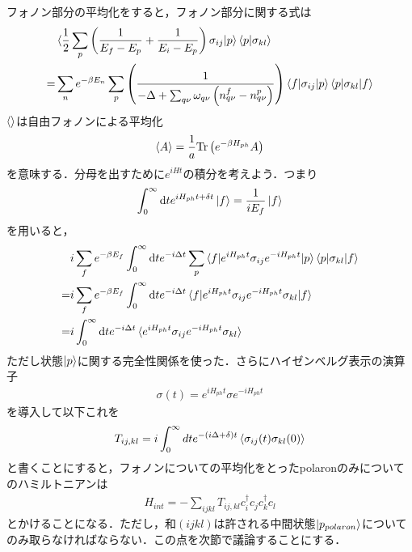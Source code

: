 \documentclass[a4j]{jarticle}
\begin{document}
フォノン部分の平均化をすると，フォノン部分に関する式は
\begin{align*}
 &\braket{\frac{1}{2}\sum_{p}\left(\frac{1}{E_f-E_p}+\frac{1}{E_i-E_p}\right)\sigma_{ij} |p}\braket{p |\sigma_{kl}} \\
=&\sum_{n}e^{-\beta E_n}\sum_{p}\left(\frac{1}{-\Delta +\sum_{q\nu}\omega_{q\nu}\left(n^f_{q\nu}-n^p_{q\nu}\right)}\right)\braket{f|\sigma_{ij}|p}\braket{p|\sigma_{kl}|f}
\end{align*}
$\braket{}$は自由フォノンによる平均化
\begin{align}
 \braket{A}=\frac{1}{a}\mathrm{Tr}\left(e^{-\beta H_{ph}}A\right)
\end{align}
を意味する．分母を出すために$e^{iHt}$の積分を考えよう．つまり
\begin{align*}
 \int_{0}^{\infty}\mathrm{d}te^{iH_{ph}t+\delta t}\ket{f}=\frac{1}{iE_f}\ket{f}
\end{align*}
を用いると，
\begin{align*}
 &i\sum_{f}e^{-\beta E_f}\int_{0}^{\infty}\mathrm{d}te^{-i\Delta t}\sum_{p}\braket{f|e^{iH_{ph}t}\sigma_{ij}e^{-iH_{ph}t}|p}\braket{p|\sigma_{kl}|f} \\
=&i\sum_{f}e^{-\beta E_f}\int_{0}^{\infty}\mathrm{d}te^{-i\Delta t}\braket{f|e^{iH_{ph}t}\sigma_{ij}e^{-iH_{ph}t}\sigma_{kl}|f} \\ 
=&i\int_{0}^{\infty}\mathrm{d}te^{-i\Delta t}\braket{e^{iH_{ph}t}\sigma_{ij}e^{-iH_{ph}t}\sigma_{kl}} 
\end{align*}
ただし状態$\ket{p}$に関する完全性関係を使った．さらにハイゼンベルグ表示の演算子
\begin{align}
 \sigma(t)=e^{iH_{ph}t}\sigma e^{-iH_{ph}t}
\end{align}
を導入して以下これを
\begin{align}
 T_{ij,kl}=i\int_{0}^{\infty}dte^{-(i\Delta +\delta)t}\braket{\sigma_{ij}(t)\sigma_{kl}(0)}
\end{align}
と書くことにすると，フォノンについての平均化をとったpolaronのみについてのハミルトニアンは
\begin{align}
 H_{int}=-\sum_{ijkl}T_{ij,kl}c^{\dagger}_ic_jc^{\dagger}_kc_l
\end{align}
とかけることになる．ただし，和$(ijkl)$は許される中間状態$\ket{p_{polaron}}$についてのみ取らなければならない．この点を次節で議論することにする．

\end{document}
